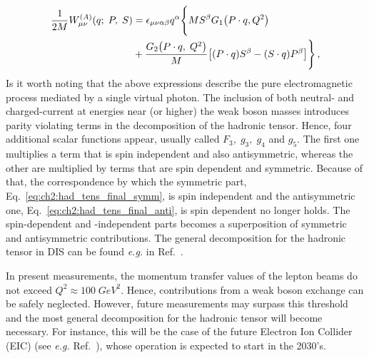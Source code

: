 \begin{equation}
  \begin{split}
    \frac{1}{2M} W_{\mu \nu}^{(A)} (q; \; P, \; S) & = \epsilon_{\mu \nu \alpha \beta} q^{\alpha} \Biggl\{ M S^{\beta} G_1 \qty(P\cdot q, Q^2) \Biggr.\\
    & +  \Biggl. \frac{G_2 \qty(P \cdot q,\;Q^2)}{M} \qty[ (P \cdot q) S^{\beta} - (S \cdot q) P^{\beta} ]\Biggr\} \,,
  \end{split}  
\end{equation}
Is it worth noting that the above expressions describe the pure electromagnetic process mediated by a single virtual photon. The inclusion of both neutral- and charged-current at energies near (or higher) the weak boson masses introduces parity violating terms in the decomposition of the hadronic tensor. Hence, four additional scalar functions appear, usually called $F_3, \; g_3,\; g_4$ and $g_5$. The first one multiplies a term that is spin independent and also antisymmetric, whereas the other are multiplied by terms that are spin dependent and symmetric. Because of that, the correspondence by which the symmetric part, Eq.~\eqref{eq:ch2:had_tens_final_symm}, is spin independent and the antisymmetric one, Eq.~\eqref{eq:ch2:had_tens_final_anti}, is spin dependent no longer holds. The spin-dependent and -independent parts becomes a superposition of symmetric and antisymmetric contributions. The general decomposition for the hadronic tensor in DIS can be found \textit{e.g.} in Ref.~\cite{Anselmino:1993tc}.%

In present measurements, the momentum transfer values of the lepton beams do not exceed  $Q^2 \approx 100 \; GeV^2$. Hence, contributions from a weak boson exchange can be safely neglected. However, future measurements may surpass this threshold and the most general decomposition for the hadronic tensor will become necessary. For instance, this will be the case of the future Electron Ion Collider (EIC) (see \textit{e.g.} Ref.~\cite{Borsa:2020lsz}), whose operation is expected to start in the 2030's.\par

